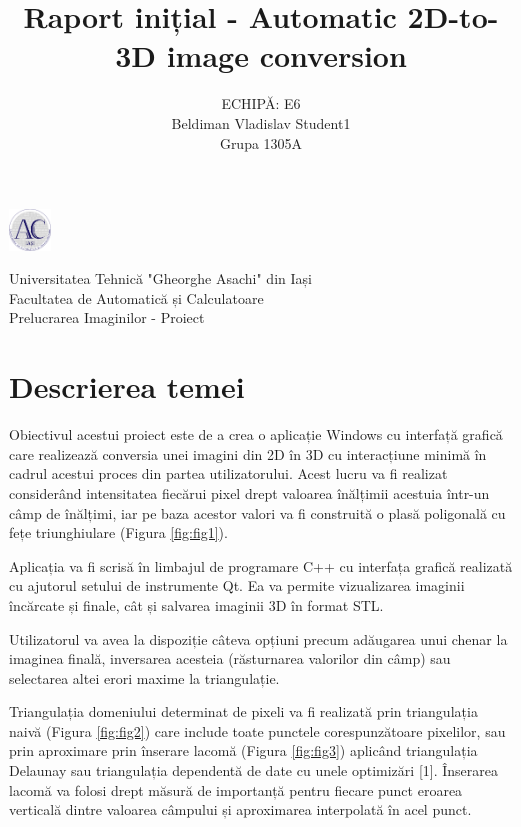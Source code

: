 \documentclass[12pt]{article}
\title{\textbf{Raport inițial - Automatic 2D-to-3D image conversion}}
\author{
 	ECHIPĂ: E6
	\\
	 Beldiman Vladislav Student1
	\\
	Grupa 1305A
}
\begin{document}
\noindent\begin{minipage}{0.1\textwidth}
	\includegraphics[width=1.1cm]{logo_AC.png}
\end{minipage}
\hfill
\begin{minipage}{1\textwidth}\raggedright
	Universitatea Tehnică "Gheorghe Asachi" din Iași\\
	Facultatea de Automatică și Calculatoare\\
	Prelucrarea Imaginilor - Proiect
\end{minipage}

\vspace{5cm}
{\let\newpage\relax\maketitle}
\newpage

\section{Descrierea temei}

Obiectivul acestui proiect este de a crea o aplicație Windows cu interfață grafică care realizează conversia unei imagini din 2D în 3D cu interacțiune minimă în cadrul acestui proces din partea utilizatorului. Acest lucru va fi realizat considerând intensitatea fiecărui pixel drept valoarea înălțimii acestuia într-un câmp de înălțimi, iar pe baza acestor valori va fi construită o plasă poligonală cu fețe triunghiulare (Figura \ref{fig:fig1}).

Aplicația va fi scrisă în limbajul de programare C++ cu interfața grafică realizată cu ajutorul setului de instrumente Qt. Ea va permite vizualizarea imaginii încărcate și finale, cât și salvarea imaginii 3D în format STL.

Utilizatorul va avea la dispoziție câteva opțiuni precum adăugarea unui chenar la imaginea finală, inversarea acesteia (răsturnarea valorilor din câmp) sau selectarea altei erori maxime la triangulație.

Triangulația domeniului determinat de pixeli va fi realizată prin triangulația naivă (Figura \ref{fig:fig2}) care include toate punctele corespunzătoare pixelilor, sau prin aproximare prin înserare lacomă (Figura \ref{fig:fig3}) aplicând triangulația Delaunay sau triangulația dependentă de date cu unele optimizări [1]. Înserarea lacomă va folosi drept măsură de importanță pentru fiecare punct eroarea verticală dintre valoarea câmpului și aproximarea interpolată în acel punct.
\end{document}
